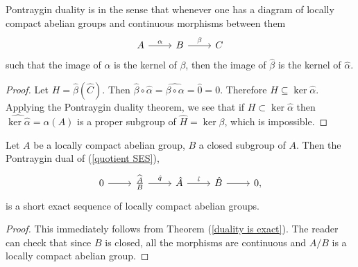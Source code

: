 \begin{theorem}\label{duality is exact}
Pontraygin duality is  in the sense that whenever one has a diagram of locally compact abelian groups and continuous morphisms between them
$$\begin{tikzcd}
A \arrow[r,"\alpha"] & B \arrow[r, "\beta"] & C
\end{tikzcd}
$$
such that the image of $\alpha$ is the kernel of $\beta$, then the image of $\hat \beta$ is the kernel of $\hat \alpha$.
\end{theorem}
\begin{proof}
Let $H = \hat \beta(\hat C)$. Then $\hat \beta \circ \hat \alpha = \widehat{\beta \circ \alpha} = \hat 0 = 0$. Therefore $H \subseteq \ker \hat \alpha$.
Applying the Pontraygin duality theorem, we see that if $H \subset \ker \hat \alpha$ then $\widehat{\ker \hat \alpha} = \alpha(A)$ is a proper subgroup of $\hat H = \ker \beta$, which is impossible.
\end{proof}

\begin{corollary}\label{duality is exact 2}
Let $A$ be a locally compact abelian group, $B$ a closed subgroup of $A$.
Then the Pontraygin dual of (\ref{quotient SES}),
$$
\begin{tikzcd}
0 \arrow[r] & \widehat{\frac{A}{B}} \arrow[r,"\hat q"] & \hat A \arrow[r,"\hat \iota"] & \hat B \arrow[r] & 0,
\end{tikzcd}$$
is a short exact sequence of locally compact abelian groups.
\end{corollary}
\begin{proof}
This immediately follows from Theorem (\ref{duality is exact}).
The reader can check that since $B$ is closed, all the morphisms are continuous and $A/B$ is a locally compact abelian group.
\end{proof}

